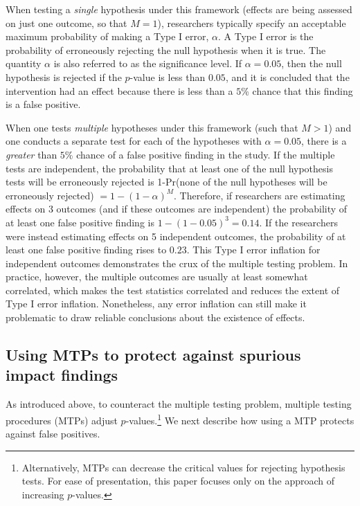\documentclass[
]{article}
\begin{document}
When testing a \emph{single} hypothesis under this framework (effects
are being assessed on just one outcome, so that \(M=1\)), researchers
typically specify an acceptable maximum probability of making a Type I
error, \(\alpha\). A Type I error is the probability of erroneously
rejecting the null hypothesis when it is true. The quantity \(\alpha\)
is also referred to as the significance level. If \(\alpha=0.05\), then
the null hypothesis is rejected if the \(p\)-value is less than
\(0.05\), and it is concluded that the intervention had an effect
because there is less than a \(5\)\% chance that this finding is a false
positive.

When one tests \emph{multiple} hypotheses under this framework (such
that \(M>1\)) and one conducts a separate test for each of the
hypotheses with \(\alpha=0.05\), there is a \emph{greater} than \(5\%\)
chance of a false positive finding in the study. If the multiple tests
are independent, the probability that at least one of the null
hypothesis tests will be erroneously rejected is 1-Pr(none of the null
hypotheses will be erroneously rejected) \(= 1-(1-\alpha)^M\).
Therefore, if researchers are estimating effects on 3 outcomes (and if
these outcomes are independent) the probability of at least one false
positive finding is \(1-(1-0.05)^3=0.14\). If the researchers were
instead estimating effects on 5 independent outcomes, the probability of
at least one false positive finding rises to \(0.23\). This Type I error
inflation for independent outcomes demonstrates the crux of the multiple
testing problem. In practice, however, the multiple outcomes are usually
at least somewhat correlated, which makes the test statistics correlated
and reduces the extent of Type I error inflation. Nonetheless, any error
inflation can still make it problematic to draw reliable conclusions
about the existence of effects.

\subsection{Using MTPs to protect against spurious impact findings}
\label{sec:mtp_use}

As introduced above, to counteract the multiple testing problem,
multiple testing procedures (MTPs) adjust
\(p\)-values.\footnote{Alternatively, MTPs can decrease the critical values for rejecting hypothesis tests. For ease of presentation, this paper focuses only on the approach of increasing $p$-values.}
We next describe how using a MTP protects against false positives.
\end{document}
